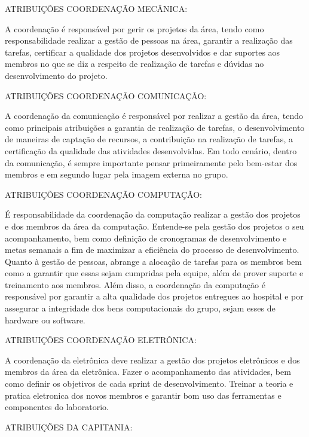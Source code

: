 \documentclass[../poliXuniversity_hospital_(USP)_report.tex]{subfiles}
\begin{document}
ATRIBUIÇÕES COORDENAÇÃO MECÂNICA:

A coordenação é responsável por gerir os projetos da área, tendo como responsabilidade realizar a gestão de pessoas na área, garantir a realização das tarefas, certificar a qualidade dos projetos desenvolvidos e dar suportes aos membros no que se diz a respeito de realização de tarefas e dúvidas no desenvolvimento do projeto.

ATRIBUIÇÕES COORDENAÇÃO COMUNICAÇÃO:

A coordenação da comunicação é responsável por realizar a gestão da área, tendo como principais atribuições a garantia de realização de tarefas, o desenvolvimento de maneiras de captação de recursos, a contribuição na realização de tarefas, a certificação da qualidade das atividades desenvolvidas. Em todo cenário, dentro da comunicação, é sempre importante pensar primeiramente pelo bem-estar dos membros e em segundo lugar pela imagem externa no grupo.

ATRIBUIÇÕES COORDENAÇÃO COMPUTAÇÃO:

É responsabilidade da coordenação da computação realizar a gestão dos projetos e dos membros da área da computação. Entende-se pela gestão dos projetos o seu acompanhamento, bem como definição de cronogramas de desenvolvimento e metas semanais a fim de maximizar a eficiência do processo de desenvolvimento. Quanto à gestão de pessoas, abrange a alocação de tarefas para os membros bem como a garantir que essas sejam cumpridas pela equipe, além de prover suporte e treinamento aos membros. Além disso, a coordenação da computação é responsável por garantir a alta qualidade dos projetos entregues ao hospital e por assegurar a integridade dos bens computacionais do grupo, sejam esses de hardware ou software.

ATRIBUIÇÕES COORDENAÇÃO ELETRÔNICA:

A coordenação da eletrônica deve realizar a gestão dos projetos eletrônicos e dos membros da área da eletrônica. Fazer o acompanhamento das atividades, bem como definir os objetivos de cada sprint de desenvolvimento. Treinar a teoria e pratica eletronica dos novos membros e garantir bom uso das ferramentas e componentes do laboratorio.

ATRIBUIÇÕES DA CAPITANIA:
\end{document}
